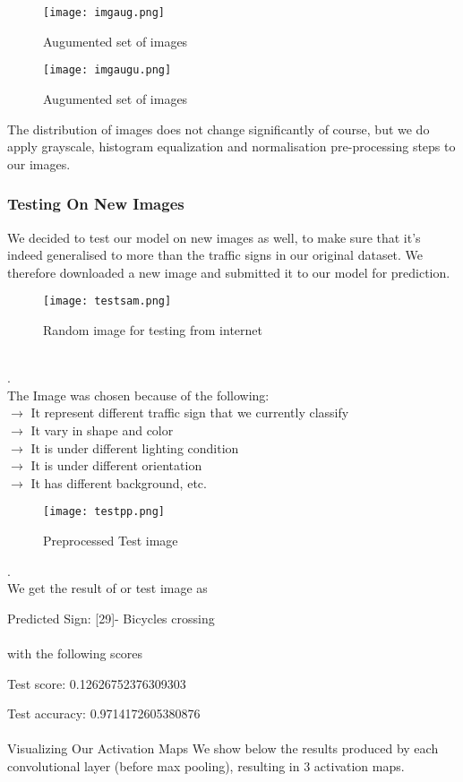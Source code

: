 \begin{figure}[H]
	\centering
	\texttt{[image: imgaug.png]}
	\caption{Augumented set of images}
\end{figure}
\begin{figure}[H]
	\centering
	\texttt{[image: imgaugu.png]}
	\caption{Augumented set of images}
\end{figure}

The distribution of images does not change significantly of course, but we do apply grayscale, histogram equalization and normalisation pre-processing steps to our images.

\subsubsection{Testing On New Images}
We decided to test our model on new images as well, to make sure that it’s indeed generalised to more than the traffic signs in our original dataset. We therefore downloaded a new image and submitted it to our model for prediction.
\begin{figure}[H]
	\centering
	\texttt{[image: testsam.png]}
	\caption{Random image for testing from internet}
\end{figure}\\
.\\
The Image was chosen because of the following:\\
$\to$ It represent different traffic sign that we currently classify\\
$\to$ It vary in shape and color\\
$\to$ It is under different lighting condition\\
$\to$ It is under different orientation\\
$\to$ It has different background, etc.

\begin{figure}[H]
	\centering
	\texttt{[image: testpp.png]}
	\caption{Preprocessed Test image}
\end{figure}
.\\
We get the result of or test image as 

Predicted Sign: [29]- Bicycles crossing\\\\
with the following scores

Test score: 0.12626752376309303
		
Test accuracy: 0.9714172605380876\\\\
Visualizing Our Activation Maps
We show below the results produced by each convolutional layer (before max pooling), resulting in 3 activation maps.\\

